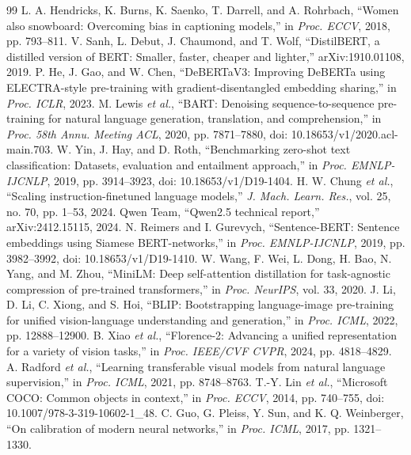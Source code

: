 \documentclass[12pt,a4paper,oneside]{report}
\begin{document}
\begin{thebibliography}{99}
 L. A. Hendricks, K. Burns, K. Saenko, T. Darrell, and A. Rohrbach, ``Women also snowboard: Overcoming bias in captioning models,'' in \textit{Proc. ECCV}, 2018, pp. 793--811.
 V. Sanh, L. Debut, J. Chaumond, and T. Wolf, ``DistilBERT, a distilled version of BERT: Smaller, faster, cheaper and lighter,'' arXiv:1910.01108, 2019.
 P. He, J. Gao, and W. Chen, ``DeBERTaV3: Improving DeBERTa using ELECTRA-style pre-training with gradient-disentangled embedding sharing,'' in \textit{Proc. ICLR}, 2023.
 M. Lewis \textit{et al.}, ``BART: Denoising sequence-to-sequence pre-training for natural language generation, translation, and comprehension,'' in \textit{Proc. 58th Annu. Meeting ACL}, 2020, pp. 7871--7880, doi: 10.18653/v1/2020.acl-main.703.
 W. Yin, J. Hay, and D. Roth, ``Benchmarking zero-shot text classification: Datasets, evaluation and entailment approach,'' in \textit{Proc. EMNLP-IJCNLP}, 2019, pp. 3914--3923, doi: 10.18653/v1/D19-1404.
 H. W. Chung \textit{et al.}, ``Scaling instruction-finetuned language models,'' \textit{J. Mach. Learn. Res.}, vol. 25, no. 70, pp. 1--53, 2024.
 Qwen Team, ``Qwen2.5 technical report,'' arXiv:2412.15115, 2024.
 N. Reimers and I. Gurevych, ``Sentence-BERT: Sentence embeddings using Siamese BERT-networks,'' in \textit{Proc. EMNLP-IJCNLP}, 2019, pp. 3982--3992, doi: 10.18653/v1/D19-1410.
 W. Wang, F. Wei, L. Dong, H. Bao, N. Yang, and M. Zhou, ``MiniLM: Deep self-attention distillation for task-agnostic compression of pre-trained transformers,'' in \textit{Proc. NeurIPS}, vol. 33, 2020.
 J. Li, D. Li, C. Xiong, and S. Hoi, ``BLIP: Bootstrapping language-image pre-training for unified vision-language understanding and generation,'' in \textit{Proc. ICML}, 2022, pp. 12888--12900.
 B. Xiao \textit{et al.}, ``Florence-2: Advancing a unified representation for a variety of vision tasks,'' in \textit{Proc. IEEE/CVF CVPR}, 2024, pp. 4818--4829.
 A. Radford \textit{et al.}, ``Learning transferable visual models from natural language supervision,'' in \textit{Proc. ICML}, 2021, pp. 8748--8763.
 T.-Y. Lin \textit{et al.}, ``Microsoft COCO: Common objects in context,'' in \textit{Proc. ECCV}, 2014, pp. 740--755, doi: 10.1007/978-3-319-10602-1\_48.
 C. Guo, G. Pleiss, Y. Sun, and K. Q. Weinberger, ``On calibration of modern neural networks,'' in \textit{Proc. ICML}, 2017, pp. 1321--1330.
\end{thebibliography}
\end{document}
